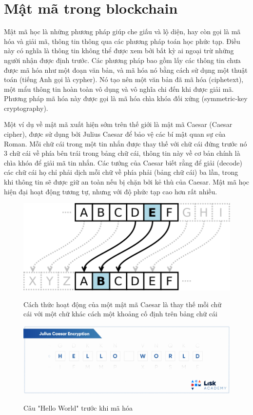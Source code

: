 \section{Mật mã trong blockchain}
Mật mã học là những phương pháp giúp che giấu và lộ diện, hay còn gọi là mã hóa và giải mã, thông tin thông qua các phương pháp toán học phức tạp. Điều này có nghĩa là thông tin không thể được xem bởi bất kỳ ai ngoại trừ  những người nhận được định trước. Các phương pháp bao gồm lấy các thông tin chưa được mã hóa như một đoạn văn bản, và mã hóa nó bằng cách sử dụng một thuật toán (tiếng Anh gọi là cypher).
Nó tạo nên một văn bản đã mã hóa (ciphetext), một mẩu thông tin hoàn toàn vô dụng và vô nghĩa chi đến khi được giải mã. Phương pháp mã hóa này được gọi là mã hóa chìa khóa đối xứng (symmetric-key cryptography).

Một ví dụ về mật mã xuất hiện sớm trên thế giới là mật mã Caesar (Caesar cipher), được sử dụng bởi Julius Caesar để bảo vệ các bí mật quan sự  của Roman. Mỗi chữ  cái trong một tin nhắn được thay thế với chữ cái đứng trước nó 3 chữ cái về phía bên trái trong bảng chữ cái, thông tin này về cơ bản chính là chìa khóa để giải mã tin nhắn. Các tướng của Caesar biết rằng để giải (decode) các chữ cái họ chỉ phải dịch mỗi chữ về phía phải (bảng chữ cái) ba lần, trong khi thông tin sẽ được giữ an toàn nếu bị chặn bởi kẻ thù của Caesar. Mật mã học hiện đại hoạt động tương tự, nhưng với độ phức tạp cao hơn rất nhiều.

 \begin{figure}[ht]
	\centering
	\includegraphics[width=0.9\linewidth]{image/Caesar_cipher_left_shift_of_3}\label{fig:Caesar}
	\caption{Cách thức hoạt động của một mật mã Caesar là thay thế mỗi chữ cái với một chữ khác cách một khoảng cố định trên bảng chữ cái}
\end{figure}

 \begin{figure}[ht]
	\centering
	\includegraphics[width=0.9\linewidth]{image/caesarBefore}\label{fig:CaesarBefore}
	\caption{Câu "Hello World" trước khi mã hóa}
\end{figure}

